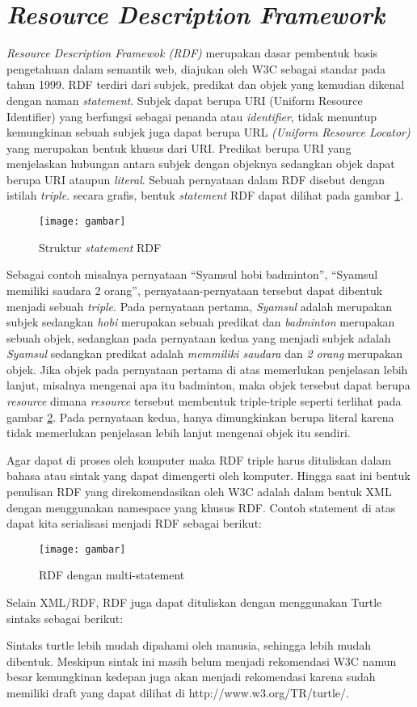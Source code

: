 \section{\emph{Resource Description Framework}}
\emph{Resource Description Framewok (RDF)} merupakan dasar pembentuk basis pengetahuan dalam semantik web, diajukan oleh W3C sebagai standar pada tahun 1999. RDF terdiri dari subjek, predikat dan objek yang kemudian dikenal dengan naman \emph{statement}. Subjek dapat berupa URI (Uniform Resource Identifier) yang berfungsi sebagai penanda atau \emph{identifier}, tidak menuntup kemungkinan sebuah subjek juga dapat berupa URL \emph{(Uniform Resource Locator)} yang merupakan bentuk khusus dari URI.  Predikat berupa URI yang menjelaskan hubungan antara subjek dengan objeknya sedangkan objek dapat berupa URI ataupun \emph{literal}. Sebuah pernyataan dalam RDF disebut dengan istilah \emph{triple}. secara grafis, bentuk \emph{statement} RDF dapat dilihat pada gambar \ref{fig:rdf_statement}.

\begin{figure}[ht]
	\centering
	\texttt{[image: gambar]}
	\caption{Struktur \emph{statement} RDF}
	\label{fig:rdf_statement}
\end{figure}

Sebagai contoh misalnya pernyataan ``Syamsul hobi badminton'', ``Syamsul memiliki saudara 2 orang'', pernyataan-pernyataan tersebut dapat dibentuk menjadi sebuah \emph{triple}. Pada pernyataan pertama, \emph{Syamsul} adalah merupakan subjek sedangkan \emph{hobi} merupakan sebuah predikat dan \emph{badminton} merupakan sebuah objek, sedangkan pada pernyataan kedua yang menjadi subjek adalah \emph{Syamsul} sedangkan predikat adalah \emph{memmiliki saudara} dan \emph{2 orang} merupakan objek. Jika objek pada pernyataan pertama di atas memerlukan penjelasan lebih lanjut, misalnya mengenai apa itu badminton, maka objek tersebut dapat berupa \emph{resource} dimana \emph{resource} tersebut membentuk triple-triple seperti terlihat pada gambar \ref{fig:rdf_multi_statement}. Pada pernyataan kedua, hanya dimungkinkan berupa literal karena tidak memerlukan penjelasan lebih lanjut mengenai objek itu sendiri.

Agar dapat di proses oleh komputer maka RDF triple harus dituliskan dalam bahasa atau sintak yang dapat dimengerti oleh komputer. Hingga saat ini bentuk penulisan RDF yang direkomendasikan oleh W3C adalah dalam bentuk XML dengan menggunakan namespace yang khusus RDF. Contoh statement di atas dapat kita serialisasi menjadi RDF sebagai berikut:

\begin{figure}[ht]
	\centering
	\texttt{[image: gambar]}
	\caption{RDF dengan multi-statement}
	\label{fig:rdf_multi_statement}
\end{figure}
Selain XML/RDF, RDF juga dapat dituliskan dengan menggunakan Turtle sintaks sebagai berikut:


Sintaks turtle lebih mudah dipahami oleh manusia, sehingga lebih mudah dibentuk. Meskipun sintak ini masih belum menjadi rekomendasi W3C namun besar kemungkinan kedepan juga akan menjadi rekomendasi karena sudah memiliki draft yang dapat dilihat di http://www.w3.org/TR/turtle/.